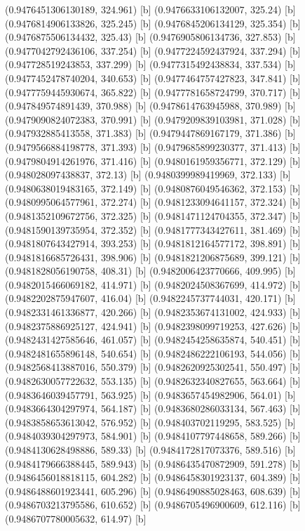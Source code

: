 {{{(0.9476451306130189, 324.961) [b] 
(0.9476633106132007, 325.24) [b] 
(0.9476814906133826, 325.245) [b] 
(0.9476845206134129, 325.354) [b] 
(0.9476875506134432, 325.43) [b] 
(0.9476905806134736, 327.853) [b] 
(0.9477042792436106, 337.254) [b] 
(0.9477224592437924, 337.294) [b] 
(0.947728519243853, 337.299) [b] 
(0.9477315492438834, 337.534) [b] 
(0.9477452478740204, 340.653) [b] 
(0.9477464757427823, 347.841) [b] 
(0.9477759445930674, 365.822) [b] 
(0.9477781658724799, 370.717) [b] 
(0.947849574891439, 370.988) [b] 
(0.9478614763945988, 370.989) [b] 
(0.9479090824072383, 370.991) [b] 
(0.9479209839103981, 371.028) [b] 
(0.947932885413558, 371.383) [b] 
(0.9479447869167179, 371.386) [b] 
(0.9479566884198778, 371.393) [b] 
(0.9479685899230377, 371.413) [b] 
(0.9479804914261976, 371.416) [b] 
(0.9480161959356771, 372.129) [b] 
(0.948028097438837, 372.13) [b] 
(0.9480399989419969, 372.133) [b] 
(0.9480638019483165, 372.149) [b] 
(0.9480876049546362, 372.153) [b] 
(0.9480995064577961, 372.274) [b] 
(0.9481233094641157, 372.324) [b] 
(0.9481352109672756, 372.325) [b] 
(0.9481471124704355, 372.347) [b] 
(0.9481590139735954, 372.352) [b] 
(0.9481777343427611, 381.469) [b] 
(0.9481807643427914, 393.253) [b] 
(0.9481812164577172, 398.891) [b] 
(0.9481816685726431, 398.906) [b] 
(0.9481821206875689, 399.121) [b] 
(0.9481828056190758, 408.31) [b] 
(0.9482006423770666, 409.995) [b] 
(0.9482015466069182, 414.971) [b] 
(0.9482024508367699, 414.972) [b] 
(0.9482202875947607, 416.04) [b] 
(0.9482245737744031, 420.171) [b] 
(0.9482331461336877, 420.266) [b] 
(0.9482353674131002, 424.933) [b] 
(0.9482375886925127, 424.941) [b] 
(0.9482398099719253, 427.626) [b] 
(0.9482431427585646, 461.057) [b] 
(0.9482454258635874, 540.451) [b] 
(0.9482481655896148, 540.654) [b] 
(0.9482486222106193, 544.056) [b] 
(0.9482568413887016, 550.379) [b] 
(0.9482620925302541, 550.497) [b] 
(0.9482630057722632, 553.135) [b] 
(0.9482632340827655, 563.664) [b] 
(0.9483646039457791, 563.925) [b] 
(0.9483657454982906, 564.01) [b] 
(0.9483664304297974, 564.187) [b] 
(0.9483680286033134, 567.463) [b] 
(0.9483858653613042, 576.952) [b] 
(0.948403702119295, 583.525) [b] 
(0.9484039304297973, 584.901) [b] 
(0.9484107797448658, 589.266) [b] 
(0.9484130628498886, 589.33) [b] 
(0.9484172817073376, 589.516) [b] 
(0.9484179666388445, 589.943) [b] 
(0.9486435470872909, 591.278) [b] 
(0.9486456018818115, 604.282) [b] 
(0.9486458301923137, 604.389) [b] 
(0.9486488601923441, 605.296) [b] 
(0.9486490885028463, 608.639) [b] 
(0.9486703213795586, 610.652) [b] 
(0.9486705496900609, 612.116) [b] 
(0.9486707780005632, 614.97) [b] 
}}}
